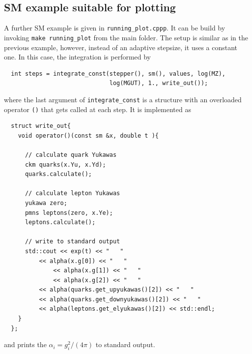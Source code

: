 \documentclass[11pt,a4paper]{article}
\begin{document}
\subsection{\label{sec::sm_plot_example} SM example suitable for plotting}
A further SM example is given in \texttt{running\_plot.cppp}. It can be build by invoking \texttt{make running\_plot} from the main folder.
The setup is similar as in the previous example, however, instead of an adaptive stepsize, it uses a constant one.
In this case, the integration is performed by
\begin{lstlisting}
  int steps = integrate_const(stepper(), sm(), values, log(MZ),
                              log(MGUT), 1., write_out());
\end{lstlisting}
where the last argument of \texttt{integrate\_const} is a structure with an overloaded operator \texttt{()} that gets called at each step.
It is implemented as
\begin{lstlisting}
  struct write_out{
    void operator()(const sm &x, double t ){

      // calculate quark Yukawas
      ckm quarks(x.Yu, x.Yd);
      quarks.calculate();

      // calculate lepton Yukawas
      yukawa zero;
      pmns leptons(zero, x.Ye);
      leptons.calculate();
    
      // write to standard output
      std::cout << exp(t) << "   "
	      << alpha(x.g[0]) << "   "
      	      << alpha(x.g[1]) << "   "
      	      << alpha(x.g[2]) << "   "
	      << alpha(quarks.get_upyukawas()[2]) << "   "
	      << alpha(quarks.get_downyukawas()[2]) << "   "
	      << alpha(leptons.get_elyukawas()[2]) << std::endl;
    }
  };
\end{lstlisting}
and prints the $\alpha_i = g_i^2/\left(4\pi\right)$ to standard output.
\end{document}
